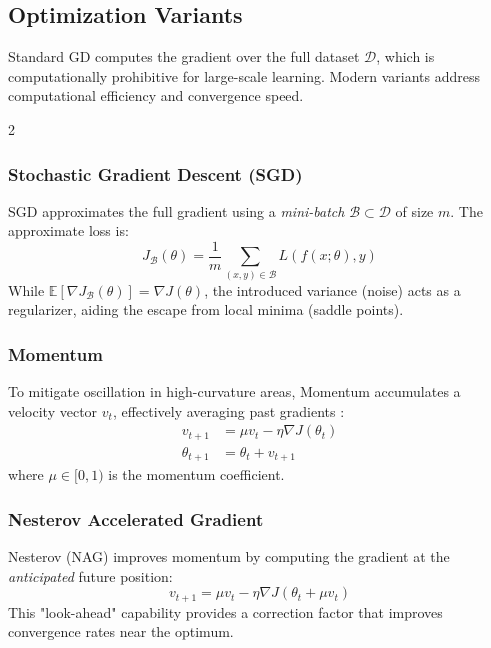 \subsection{Optimization Variants}

Standard GD computes the gradient over the full dataset $\mathcal{D}$, which is computationally prohibitive for large-scale learning. Modern variants address computational efficiency and convergence speed.

\setlength{\columnsep}{1cm}
\begin{multicols}{2}

\subsubsection{Stochastic Gradient Descent (SGD)}
SGD approximates the full gradient using a \textit{mini-batch} $\mathcal{B} \subset \mathcal{D}$ of size $m$. The approximate loss is:
\begin{equation}
    J_{\mathcal{B}}(\theta) = \frac{1}{m} \sum_{(x,y) \in \mathcal{B}} L(f(x;\theta), y)
\end{equation}
While $\mathbb{E}[\nabla J_{\mathcal{B}}(\theta)] = \nabla J(\theta)$, the introduced variance (noise) acts as a regularizer, aiding the escape from local minima (saddle points).

\subsubsection{Momentum}
To mitigate oscillation in high-curvature areas, Momentum accumulates a velocity vector $v_t$, effectively averaging past gradients \citep{Rumelhart1986}:
\begin{align}
    v_{t+1} &= \mu v_t - \eta \nabla J(\theta_t) \\
    \theta_{t+1} &= \theta_t + v_{t+1}
\end{align}
where $\mu \in [0, 1)$ is the momentum coefficient.

\subsubsection{Nesterov Accelerated Gradient}
Nesterov (NAG) improves momentum by computing the gradient at the \textit{anticipated} future position:
\begin{equation}
    v_{t+1} = \mu v_t - \eta \nabla J(\theta_t + \mu v_t)
\end{equation}
This "look-ahead" capability provides a correction factor that improves convergence rates near the optimum.


\end{multicols}
